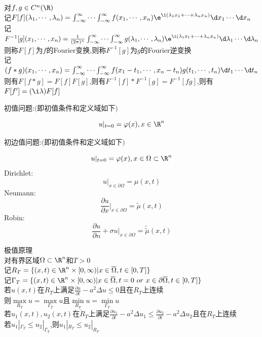 \begin{dingli*}
对$f,g\in C^{n}(\R)$\\
记$F[f](\lambda_1,\cdots,\lambda_n)=\int_{-\infty}^{\infty}\cdots\int_{-\infty}^{\infty}f(x_1,\cdots,x_n)\e^{\i(\lambda_1 x_1+\cdots+\lambda_n x_n)}\d x_1\cdots\d x_n$\\
记$F^{-1}[g](x_1,\cdots,x_n)=\frac{1}{(2\pi)^{n}}\int_{-\infty}^{\infty}\cdots\int_{-\infty}^{\infty}g(\lambda_1,\cdots,\lambda_n)\e^{\i (\lambda_1x_1+\cdots+\lambda_n x_n)}\d\lambda_1\cdots\d \lambda_n$\\
则称$F[f]$为$f$的Fourier变换,则称$F^{-1}[g]$为$g$的Fourier逆变换\\
记$(f*g)(x_1,\cdots,x_n)=\int_{-\infty}^{\infty}\cdots\int_{-\infty}^{\infty}f(x_1-t_1,\cdots,x_n-t_n)g(t_1,\cdots,t_n)\d t_1\cdots\d t_n$\\
则有$F[f*g]=F[f]F[g]$,则有$F^{-1}[f]*F^{-1}[g]=F^{-1}[fg]$,则有$F[f']=(\i\lambda)F[f]$
\end{dingli*}

初值问题:$($即初值条件和定义域如下$)$

\[u|_{t=0}=\varphi(x),x\in\R^n\]

初边值问题:$($即初值条件和定义域如下$)$

\[u|_{t=0}=\varphi(x),x\in\Omega\subset\R^n\]
Dirichlet:
\[u|_{x\in\partial\Omega}=\mu(x,t)\] 
Neumann:
\[\frac{\partial u}{\partial x}|_{x\in\partial\Omega}=\widetilde{\mu}(x,t)\] 
Robin:
\[\frac{\partial u}{\partial n}+\sigma u|_{x\in\partial\Omega}=\widetilde{\widetilde{\mu}}(x,t)\] 

\begin{dingli*}
极值原理\\
对有界区域$\Omega\subset \R^n$和$T>0$\\
记$R_T=\{(x,t)\in \R^n\times[0,\infty)|x\in \overline{\Omega},t\in[0,T]\}$\\
记$\Gamma_T=\{(x,t)\in \R^n\times[0,\infty)|x\in \overline{\Omega},t=0\  or\ x\in \partial\overline{\Omega},t\in [0,T] \}$\\
若$u(x,t)$在$\mathring{R}_T$上满足$\frac{\partial u}{\partial t}-a^2\Delta u\leq 0$且在$R_T$上连续\\
则$\max\limits_{R_T}u=\max\limits_{\Gamma_T}u$且$\min\limits_{R_T}u=\min\limits_{\Gamma_{T}}u$\\
若$u_1(x,t),u_2(x,t)$在$\mathring{R}_T$上满足$\frac{\partial u_1}{\partial t}-a^2\Delta u_1\leq \frac{\partial u_2}{\partial t}-a^2\Delta u_2$且在$R_T$上连续\\
若$u_1|_{\Gamma_T}\leq u_2|_{\Gamma_T}$,则$u_1|_{R_T}\leq u_2|_{R_T}$
\end{dingli*}

